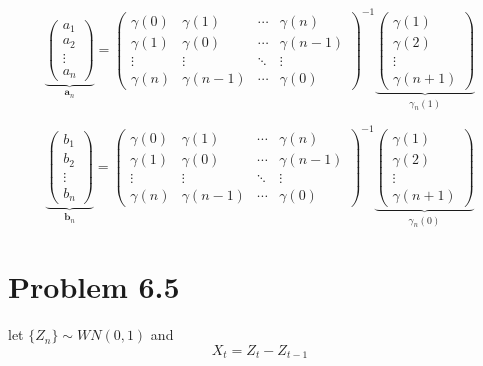 \documentclass[11pt, oneside]{article}   	%
\begin{document}
  \begin{equation}
 \underbrace{
  \begin{pmatrix}
 a_{1}\\
 a_{2}\\
 \vdots\\
 a_{n}
 \end{pmatrix}
 }_{\textbf{a}_{n}}
  = 
  \begin{pmatrix}
  \gamma(0) & \gamma(1) & \cdots & \gamma(n) \\
  \gamma(1) & \gamma(0) & \cdots & \gamma(n-1) \\
  \vdots  & \vdots  & \ddots & \vdots  \\
  \gamma(n) & \gamma(n-1) & \cdots & \gamma(0) 
 \end{pmatrix}^{-1}
  \underbrace{
  \begin{pmatrix}
 \gamma(1)\\
 \gamma(2)\\
 \vdots\\
 \gamma(n+1)
 \end{pmatrix}
  }_{\gamma_{n}(1)}
 \end{equation}
 
 
 \begin{equation}
 \underbrace{
  \begin{pmatrix}
 b_{1}\\
 b_{2}\\
 \vdots\\
 b_{n}
 \end{pmatrix}
 }_{\textbf{b}_{n}}
  = 
  \begin{pmatrix}
  \gamma(0) & \gamma(1) & \cdots & \gamma(n) \\
  \gamma(1) & \gamma(0) & \cdots & \gamma(n-1) \\
  \vdots  & \vdots  & \ddots & \vdots  \\
  \gamma(n) & \gamma(n-1) & \cdots & \gamma(0) 
 \end{pmatrix}^{-1}
  \underbrace{
  \begin{pmatrix}
 \gamma(1)\\
 \gamma(2)\\
 \vdots\\
 \gamma(n+1)
 \end{pmatrix}
  }_{\gamma_{n}(0)}
 \end{equation}

\section{Problem 6.5}
let $\{Z_{n}\} \sim WN(0,1)$ and 
\begin{equation} \label{eq:p}
X_{t} = Z_{t} - Z_{t-1}
\end{equation}
\end{document}
